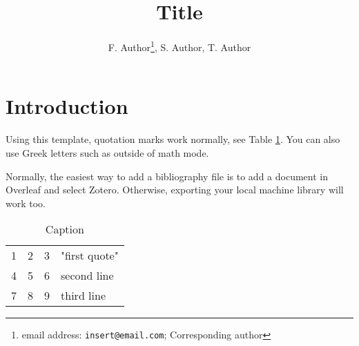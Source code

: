 \documentclass[12pt, letterpaper]{article}
\title{Title}
\author{F. Author\thanks{email address: \texttt{insert@email.com}; Corresponding author}, S. Author, T. Author}
\date{}
\newcommand{\beginsupplement}{%
        \setcounter{table}{0}
        \renewcommand{\thetable}{S\arabic{table}}%
        \setcounter{figure}{0}
        \renewcommand{\thefigure}{S\arabic{figure}}%
     }
\begin{document}
\maketitle

\begin{abstract}
    \noindent \lipsum[1]
\end{abstract}

\section{Introduction}

\lipsum[2]

Using this template, quotation marks work normally, see Table \ref{tab:example}. You can also use Greek letters such as \texttheta{} outside of math mode. 

Normally, the easiest way to add a bibliography file is to add a document in Overleaf and select Zotero. Otherwise, exporting your local machine library will work too.


\begin{table}[ht]
    \centering
    \caption{Caption}
    \begin{tabular}{ l | c | r | p{3cm}}
        \hline			
        1 & 2 & 3 & "first quote" \\
        4 & 5 & 6 & second line \\
        7 & 8 & 9 & third line \\
        \hline  
    \end{tabular}
    \label{tab:example}
\end{table}


\iffalse

\begin{figure}
    \centering
    \texttt{[image: figures/]}
    \caption{Caption}
    \label{fig:example}
\end{figure}

\fi

\printbibliography

\beginsupplement

\end{document}
